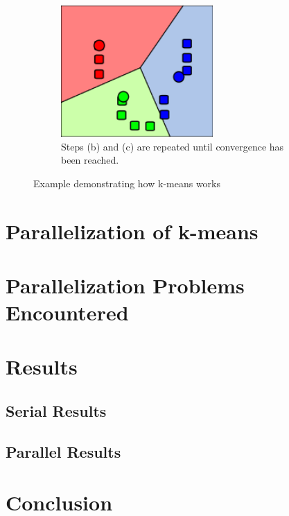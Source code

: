 \documentclass{article}
\begin{document}
\begin{figure}
    \begin{subfigure}{0.5\textwidth}
        \includegraphics[width=0.9\linewidth, height=5cm]{Pictures/K_Means_Example_Step_4.png}
        \caption{Steps (b) and (c) are repeated until convergence has been reached.}
    \end{subfigure}
\caption{Example demonstrating how k-means works}

\end{figure}



\section{Parallelization of k-means}




\section{Parallelization Problems Encountered}




\section{Results}
\subsection{Serial Results}



\subsection{Parallel Results}




\section{Conclusion}
\end{document}
